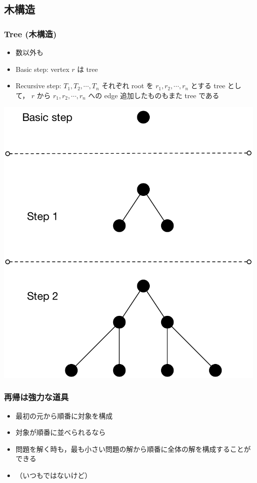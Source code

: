 \subsection{木構造}
\begin{frame}[fragile]
\frametitle{Tree (木構造)}
  \begin{itemize}
\item 数以外も
\item Basic step: vertex $r$ は tree
\item Recursive step: \(T_1,T_2,\cdots,T_n\) それぞれ root を \(r_1,r_2,\cdots,r_n\) とする tree として，
\(r\) から \(r_1,r_2,\cdots,r_n\) への edge 追加したものもまた tree である
  \end{itemize}
  \begin{center}
\includegraphics[scale=0.3]{./Figure/elementaryCS-tree.pdf}
  \end{center}
\end{frame}
\begin{frame}[fragile]
\frametitle{再帰は強力な道具}
  \begin{itemize}
\item 最初の元から順番に対象を構成
\item 対象が順番に並べられるなら
\item 問題を解く時も，最も小さい問題の解から順番に全体の解を構成することができる
\item （いつもではないけど）
  \end{itemize}
\end{frame}
